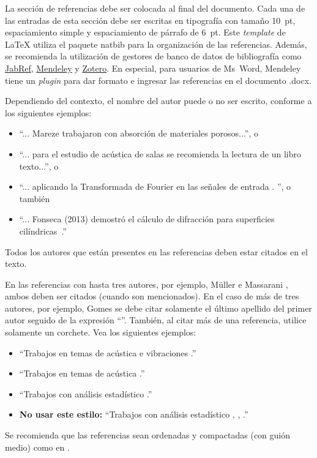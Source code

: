 \documentclass[12pt, a4paper, twoside, twocolumn]{article}
\begin{document}

La sección de referencias debe ser colocada al final del documento.  Cada una de las entradas de esta sección debe ser escritas en tipografía con tamaño 10~pt, espaciamiento simple y espaciamiento de párrafo de 6~pt. Este \textit{template} de \LaTeX\xspace utiliza el paquete {\ttfamily natbib} para la organización de las referencias. Además, se recomienda la utilización de gestores de banco de datos de bibliografía como \href{http://www.jabref.org/}{JabRef}, \href{http://www.mendeley.com}{Mendeley} y \href{https://www.zotero.org/}{Zotero}. En especial, para usuarios de Ms~Word, Mendeley tiene un \textit{plugin} para dar formato e ingresar las referencias en el documento .docx.

Dependiendo del contexto, el nombre del autor puede o no ser escrito, conforme a los siguientes ejemplos:
%
\begin{itemize}[noitemsep,topsep=0ex] \itemsep=4pt
	\item 	``... Mareze \etal \cite{Mareze-2019} trabajaron con absorción de materiales porosos...'', o
	\item ``... para el estudio de acústica de salas \cite{Brandao-2017} se recomienda la lectura de un libro texto...'', o
	\item ``... aplicando la Transformada de Fourier en las señales de entrada \cite{Oppenheim-2010}. '', o también
	\item ``... Fonseca (2013) demostró el cálculo de difracción para superficies cilíndricas~\cite{Fonseca-2013}.''
\end{itemize}
%
Todos los autores que están presentes en las referencias deben estar citados en el texto.

En las referencias con hasta tres autores, por ejemplo, Müller e Massarani \cite{Muller-2001}, ambos deben ser citados (cuando son mencionados). En el caso de más de tres autores, por ejemplo,  Gomes \etal \cite{Gomes-2015} se debe citar solamente el último apellido del primer autor seguido de la expresión ``\etal''. También, al citar más de una referencia, utilice solamente un corchete. Vea los siguientes ejemplos:
%
\begin{itemize}[noitemsep,topsep=0ex] \itemsep=8pt
	\item ``Trabajos en temas de acústica e vibraciones \cite{Mareze-2017,Fonseca-2013,Brandao-2017}.''
	\item ``Trabajos en temas de acústica \cite{Mareze-2017,Oppenheim-2010,Muller-2001,Mareze-2019}.''
	\item ``Trabajos con análisis estadístico \cite{Mareze-2017, Brandao-2017, Borges-2018}.''
		\item \textbf{No usar este estilo:} ``Trabajos con análisis estadístico \cite{Mareze-2017}, \cite{Brandao-2017}, \cite{Ristow-2016}.''
\end{itemize}
%
Se recomienda que las referencias sean ordenadas y compactadas (con guión medio) como en \cite{Mareze-2017,Oppenheim-2010,Muller-2001,Mareze-2019}.
\end{document}
